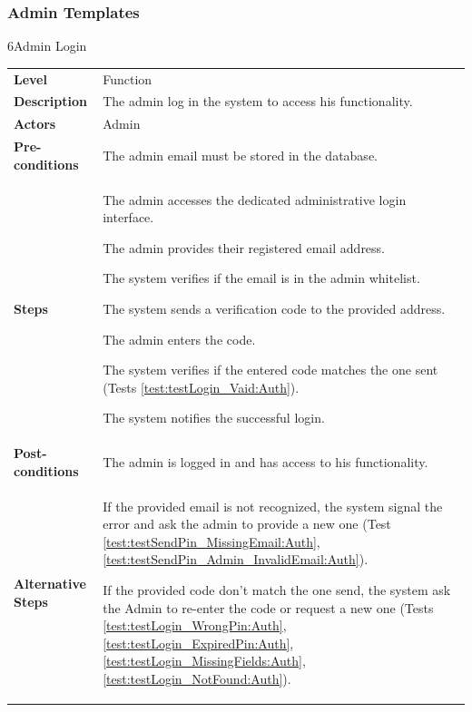 \subsubsection{Admin Templates}

\begin{usecasetable}{6}{Admin Login}
	\begin{tabularx}{\textwidth}{@{} l|X @{}}
		\textbf{Level} & Function \\
		\textbf{Description} & The admin log in the system to access his functionality. \\
		\textbf{Actors} & Admin \\
		\textbf{Pre-conditions} & The admin email must be stored in the database. \\
		\textbf{Steps} &
		\begin{tabenum}
			\item The admin accesses the dedicated administrative login interface.
			\item The admin provides their registered email address.
			\item The system verifies if the email is in the admin whitelist.
			\item The system sends a verification code to the provided address.
			\item The admin enters the code.
			\item The system verifies if the entered code matches the one sent (Tests \ref{test:testLogin_Vaid:Auth}).
			\item The system notifies the successful login.
		\end{tabenum} \\
		\textbf{Post-conditions} & The admin is logged in and has access to his functionality. \\
		\textbf{Alternative Steps} & \begin{tabitem}
			\item[3a.] If the provided email is not recognized, the system signal the error and ask the admin to provide a new one (Test \ref{test:testSendPin_MissingEmail:Auth}, \ref{test:testSendPin_Admin_InvalidEmail:Auth}).
			\item[7a.] If the provided code don't match the one send, the system ask the Admin to re-enter the code or request a new one (Tests \ref{test:testLogin_WrongPin:Auth}, \ref{test:testLogin_ExpiredPin:Auth}, \ref{test:testLogin_MissingFields:Auth}, \ref{test:testLogin_NotFound:Auth}).
		\end{tabitem}
	\end{tabularx}
\end{usecasetable}


